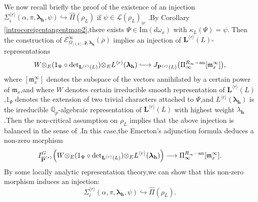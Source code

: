 \documentclass[SecEq,CM,GP]{degruyter-crelle} %
\theoremstyle{plain}
\newtheorem{rmk}[thm]{Remark}
\newcommand{\hooklongrightarrow}{\lhook\joinrel\longrightarrow}
\newcommand{\ana}{{\rm an}}
\newcommand{\bersteineigenvarpik}{{\mathcal{E}_{\omepik,\fp,\bm{\lambda}_\bh}^\infty(\overline{\rho})}}
\newcommand{\lamoverx}{{L^{\lrr}({\bm\lambda}_\bh)}}
\newcommand{\lrr}{{\langle r\rangle}}
\newcommand{\op}{{\overline{{\mathbf{P}}}}}
\newcommand{\omepik}{\Omega_{[1,k]}}
\newcommand{\te}{{\otimes_E}}
\newcommand{\BQ}{{\mathbb{Q}}}
\newcommand{\bL}{{\mathbf{L}}}
\newcommand{\bP}{{\mathbf{P}}}
\newcommand{\bh}{{\mathbf{h}}}
\newcommand{\fm}{{\mathfrak{m}}}
\newcommand{\fp}{{\mathfrak{p}}}
\newcommand{\sL}{\mathcal L}
\begin{document}
We now recall briefly the proof of the existence of an injection $\Sigma_{i}^{\lrr}(\alpha, \pi,{\bm\lambda}_\bh, \psi)\hookrightarrow \widehat{\Pi}(\rho_L)$ if $\psi\in \sL(\rho_L)_{ir}$ .\;By Corollary \ref{introcoreigentangentmap2},\;there exists $\Psi\in \mathrm{Im}(d\omega_x)$ with $\kappa_L(\Psi)=\psi.\;$Then the construction of $\bersteineigenvarpik$ implies an injection of $\bL^{\lrr}(L)$-representations
\[W\te(\mathrm{1}_\Psi\circ\mathrm{det}_{\bL^{\lrr}(L)})\te\lamoverx \hooklongrightarrow J_{\bP^{\lrr}(L)}\big(\Pi_{\infty}^{R_{\infty}-\ana}[\fm_x^\infty]\big),\]
where $[\fm_x^\infty]$ denotes the subspace of the vectors annihilated by  a certain power of $\fm_x$,\;and where $W$ denotes certain irreducible smooth representation of $\bL^{\lrr}(L)$,\;$\mathrm{1}_\Psi$ denotes the extension of two trivial characters attached to $\Psi$,\;and $\lamoverx$ is the irreducible $\BQ_p$-algebraic representation of $\bL^{\lrr}(L)$ with highest weight $\lambda_\bh$.\;Then the non-critical assumption on $\rho_L$ implies that the above injection is balanced in the sense of \cite[Definition 0.8]{emerton2007jacquet}.\;In this case,\;the Emerton's adjunction formula \cite[Theorem 0.13]{emerton2007jacquet} deduces a non-zero morphism
\[I^G_{\op^{\lrr}}\Big(W\te(\mathrm{1}_\Psi\circ\mathrm{det}_{\bL^{\lrr}(L)})\te\lamoverx\Big) \longrightarrow\Pi_{\infty}^{R_{\infty}-\ana}[\fm_x^\infty].\]
By some locally analytic representation theory,\;we can show that this non-zero morphism induces an injection:
\[\Sigma_{i}^{\lrr}(\alpha, \pi,{\bm\lambda}_\bh, \psi)\hookrightarrow \widehat{\Pi}(\rho_L).\]

\end{document}
